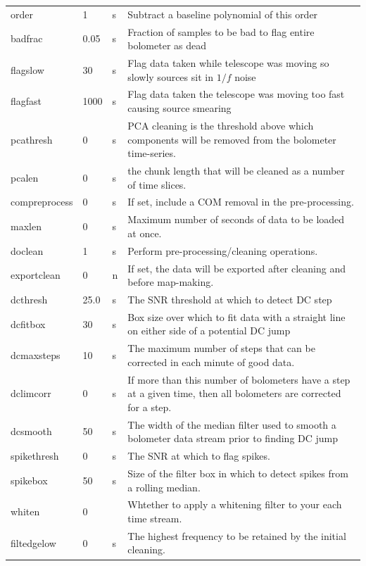 \documentclass[twoside,11pt]{article}
\renewcommand{\_}{\texttt{\symbol{95}}}
\begin{document}
\begin{htmlonly}
\begin{table}
\begin{center}
\begin{footnotesize}
\begin{tabular}{|p{2.1cm}|p{0.8cm}|p{0.2cm}|p{11.2cm}|}
order & 1 &s &Subtract a baseline polynomial of this order\\
badfrac & 0.05 &s& Fraction of samples to be bad to flag entire bolometer
                        as dead\\
flagslow & 30 & s&Flag data taken while telescope was moving so slowly
                        sources sit in $1/f$ noise\\
flagfast & 1000 &s& Flag data taken the telescope was moving too fast causing source
                        smearing\\
pcathresh & 0 &s& PCA cleaning is the threshold above which components
                        will be removed from the bolometer time-series.\\
pcalen & 0 &s &the chunk length that will be cleaned as a number of time slices.\\
compreprocess& 0 &s& If set, include a COM removal in the pre-processing.\\
maxlen& 0 &s &Maximum number of seconds of data to be loaded at once.\\
doclean& 1 &s&Perform pre-processing/cleaning operations. \\
exportclean& 0 &n&If set, the data will be exported after cleaning and before map-making. \\
dcthresh & 25.0 &s& The SNR threshold at which to detect DC step\\
dcfitbox & 30 &s& Box size over which to fit data with a straight
                        line on either side of a potential DC jump\\
dcmaxsteps & 10 &s& The maximum number of steps that can be corrected
                        in each minute of good data.\\
dclimcorr & 0 &s& If more than this number of bolometers have a step at
                        a given time, then all bolometers are corrected for
                        a step.\\
dcsmooth & 50 &s& The width of the median filter used to smooth a
                        bolometer data stream prior to finding DC jump\\
spikethresh & 0 &s& The SNR at which to flag spikes.\\
spikebox & 50 &s& Size of the filter box in which to detect spikes from a rolling median.\\
whiten & 0 &&Whtether to apply a whitening filter to your each time stream. \\
filt\_edgelow & 0 &s&The highest frequency to be retained by the initial cleaning. \\

\end{tabular}
\end{footnotesize}
\end{center}
\end{table}
\end{htmlonly}
\end{document}
